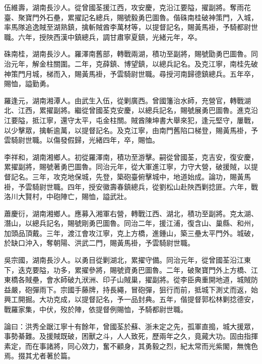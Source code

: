 \begin{pinyinscope}
伍維壽，湖南長沙人。從曾國荃援江西，攻安慶，克沿江要隘，擢副將。奪雨花臺、聚寶門外石壘，累擢記名總兵，賜號毅勇巴圖魯。偕硃南桂破神策門，入城，率馬隊追逸賊至湖熟鎮，擒斬賊酋李萬材等，以提督記名，賜黃馬褂，予騎都尉世職。六年，授陜西漢中鎮總兵，調甘肅寧夏鎮，光緒元年，卒。

硃南桂，湖南長沙人。羅澤南舊部，轉戰兩湖，積功至副將，賜號勖勇巴圖魯。同治元年，解金柱關圍。二年，克薛鎮、博望鎮，以總兵記名。及克江寧，南桂先破神策門月城，梯而入，賜黃馬褂，予雲騎尉世職。尋授河南歸德鎮總兵。五年卒，賜恤，謚勤勇。

羅逢元，湖南湘潭人。由武生入伍，從剿廣西。曾國籓治水師，充營官，轉戰湖北、江西，累擢副將。繼從曾國荃克安慶，以總兵記名，賜號展勇巴圖魯。進克沿江要隘，抵江寧，還守太平，屯金柱關。賊酋陳坤書大舉來犯，逢元堅守，屢戰，以少擊眾，擒斬逾萬，以提督記名。及克江寧，由南門舊陷口梯登，賜黃馬褂，予雲騎尉世職。以傷發假歸，光緒四年，卒，賜恤。

李祥和，湖南湘鄉人。初從羅澤南，積功至游擊。嗣從曾國荃，克吉安，復安慶，累擢副將，賜號著勇巴圖魯。同治元年，從大軍進江寧，力守大營，破援賊，以提督記名。三年，攻克地保城，先登，築砲臺俯擊城中，地道始成。論功，賜黃馬褂，予雲騎尉世職。四年，授安徽壽春鎮總兵，從劉松山赴陜西剿捻匪。六年，戰洛川大賢村，中砲陣亡，賜恤，謚武壯。

蕭慶衍，湖南湘鄉人。應募入湘軍右營，轉戰江西、湖北，積功至副將。克太湖、潛山，以總兵記名，賜號剛勇巴圖魯。同治二年，援江浦，復含山、巢縣、和州，加頭品頂戴。三年，渡江會攻江寧，克上方橋，進鍾山，築三壘太平門外。城破，於缺口沖入，奪朝陽、洪武二門，賜黃馬褂，予雲騎尉世職。

吳宗國，湖南長沙人。以勇目從剿湖北，累擢守備。同治元年，從曾國荃沿江東下，迭克要隘，功多，累擢參將，賜號資勇巴圖魯。二年，破聚寶門外上方橋、江東橋各賊壘，會水師破九洑洲、印子山賊巢，擢副將。從李臣典重開地道，城賊防益嚴，砲彈雨下。宗國手藤牌，持長繩，冒砲彈，狙行而前，抵城下測丈而返，始興工開掘。大功克成，以提督記名，予一品封典。五年，偕提督郭松林剿捻德安，戰羅家集，中伏，歿於陣，依提督例賜恤，予騎都尉世職。

論曰：洪秀全踞江寧十有餘年，曾國荃於蘇、浙未定之先，孤軍直搗，城大援眾，事勢綦難。及援賊既破，困獸之斗，人人致死，歷兩年之久，竟蕆大功。固由指揮素定，而在事諸將，同心效力，奮不顧身，其勇毅之烈，紀太常而光紫閣，無愧色焉。掇其尤者著於篇。


\end{pinyinscope}